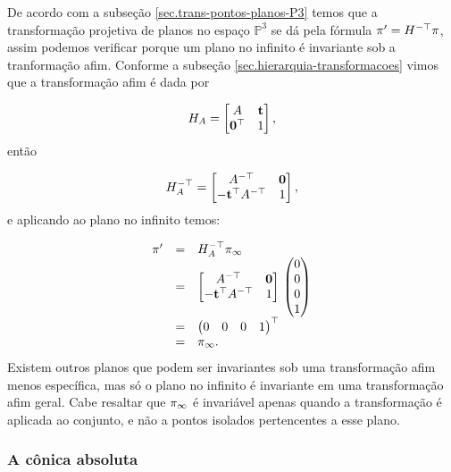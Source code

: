 De acordo com a subseção \ref{sec.trans-pontos-planos-P3} temos que a transformação projetiva de planos no espaço  $\mathbb{P}^3$ se dá pela fórmula $\pi'=H^{-\top}\pi$, assim podemos verificar porque um plano no infinito é invariante sob a tranformação afim. Conforme a subseção \ref{sec.hierarquia-transformacoes} vimos que a transformação afim é dada por 

\begin{equation*}
H_A=
\begin{bmatrix}
A&{\bf t}\\
{\bf 0}^\top&1
\end{bmatrix},
\end{equation*}
então

\begin{equation*}
H_A^{-\top}=
\begin{bmatrix}
A^{-\top}&{\bf 0}\\
-{\bf t}^\top A^{-\top}&1
\end{bmatrix},
\end{equation*}
e aplicando ao plano no infinito temos:

\begin{equation*}
\begin{array}{rcl}
\pi'&=&H_A^{-\top}\pi_\infty\\
&=&
\begin{bmatrix}
A^{-\top}&{\bf 0}\\
-{\bf t}^\top A^{-\top}&1
\end{bmatrix}\,
\begin{pmatrix}
0\\
0\\
0\\
1
\end{pmatrix}\\
&=&
\begin{pmatrix}
0&0&0&1
\end{pmatrix}^\top\\
&=&
\pi_\infty.
\end{array}
\end{equation*}
Existem outros planos que podem ser invariantes sob uma transformação afim menos específica, mas só o plano no infinito é invariante em uma transformação afim geral. Cabe resaltar que $\pi_\infty$ é invariável apenas quando a transformação é aplicada ao conjunto, e não a pontos isolados pertencentes a esse plano.


\subsubsection{A cônica absoluta}\label{sec.con-absoluta}

